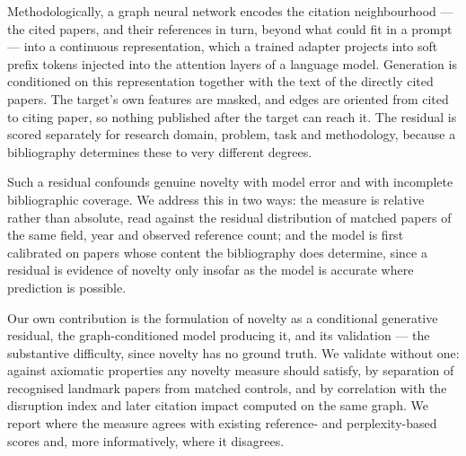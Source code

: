 \documentclass[12pt]{article}
\begin{document}
Methodologically, a graph neural network encodes the citation
neighbourhood — the cited papers, and their references in turn,
beyond what could fit in a prompt — into a continuous representation,
which a trained adapter projects into soft prefix tokens injected
into the attention layers of a language model. Generation is
conditioned on this representation together with the text of the
directly cited papers. The target's own features are masked, and
edges are oriented from cited to citing paper, so nothing published
after the target can reach it. The residual is scored separately for
research domain, problem, task and methodology, because a
bibliography determines these to very different degrees.

Such a residual confounds genuine novelty with model error and with
incomplete bibliographic coverage. We address this in two ways: the
measure is relative rather than absolute, read against the residual
distribution of matched papers of the same field, year and observed
reference count; and the model is first calibrated on papers whose
content the bibliography does determine, since a residual is evidence
of novelty only insofar as the model is accurate where prediction is
possible.

Our own contribution is the formulation of novelty as a conditional
generative residual, the graph-conditioned model producing it, and
its validation — the substantive difficulty, since novelty has no
ground truth. We validate without one: against axiomatic properties
any novelty measure should satisfy, by separation of recognised
landmark papers from matched controls, and by correlation with the
disruption index and later citation impact computed on the same
graph. We report where the measure agrees with existing reference-
and perplexity-based scores and, more informatively, where it
disagrees.
\end{document}
